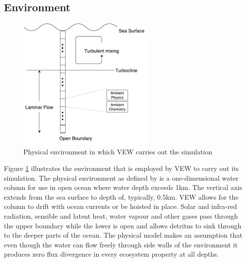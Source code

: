 \documentclass[12pt, a4paper]{report}
\begin{document}
\subsection{Environment}\label{para:1d-phys}
\begin{figure}[H]
  \begin{center}
    \includegraphics[width=0.6\textwidth,natwidth=473,natheight=466]{images/env-diagram.pdf}
    \caption{Physical environment in which VEW carries out the simulation}
    \label{fig:env}
  \end{center}
\end{figure}

Figure \ref{fig:env} illustrates the environment that is employed by VEW
to carry out its simulation. The physical environment as defined by \cite{Woods2005}
is a one-dimensional water column for use in open ocean where water depth exceeds 1km.
The vertical axis extends from the sea surface to depth of, typically, 0.5km.
VEW allows for the column to drift with ocean currents or be hoisted in place.
Solar and infra-red radiation, sensible and latent heat, water vapour
and other gases pass through the upper boundary while the lower is open
and allows detritus to sink through to the deeper parts of the ocean.
The physical model makes an assumption that even though the
water can flow freely through side walls of the environment it produces
zero flux divergence in every ecosystem property at all depths.
\end{document}
